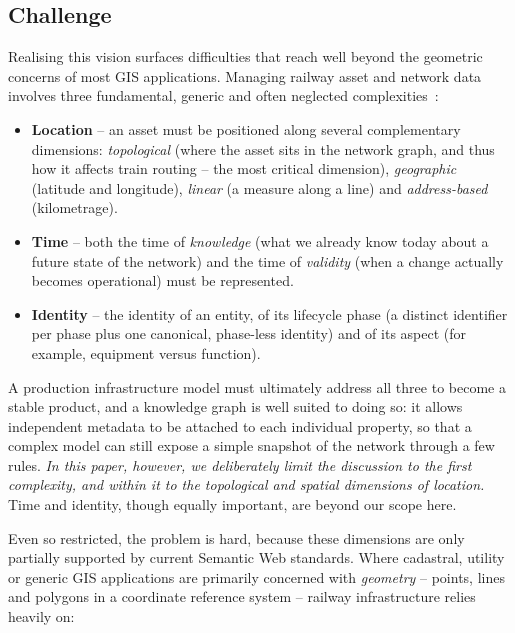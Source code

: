 \documentclass{ceurart}
\begin{document}
\subsection{Challenge}

Realising this vision surfaces difficulties that reach well beyond the geometric
concerns of most GIS applications. Managing railway asset and network data
involves three fundamental, generic and often neglected
complexities~\cite{dimvision}:

\begin{itemize}
  \item \textbf{Location} -- an asset must be positioned along several
        complementary dimensions: \emph{topological} (where the asset sits in
        the network graph, and thus how it affects train routing -- the most
        critical dimension), \emph{geographic} (latitude and longitude),
        \emph{linear} (a measure along a line) and \emph{address-based}
        (kilometrage).
  \item \textbf{Time} -- both the time of \emph{knowledge} (what we already know
        today about a future state of the network) and the time of
        \emph{validity} (when a change actually becomes operational) must be
        represented.
  \item \textbf{Identity} -- the identity of an entity, of its lifecycle phase (a
        distinct identifier per phase plus one canonical, phase-less identity)
        and of its aspect (for example, equipment versus function).
\end{itemize}

A production infrastructure model must ultimately address all three to become a
stable product, and a knowledge graph is well suited to doing so: it allows
independent metadata to be attached to each individual property, so that a
complex model can still expose a simple snapshot of the network through a few
rules. \emph{In this paper, however, we deliberately limit the discussion to the
first complexity, and within it to the topological and spatial dimensions of
location.} Time and identity, though equally important, are beyond our scope
here.

Even so restricted, the problem is hard, because these dimensions are only
partially supported by current Semantic Web standards. Where cadastral, utility
or generic GIS applications are primarily concerned with \emph{geometry} --
points, lines and polygons in a coordinate reference system -- railway
infrastructure relies heavily on:
\end{document}
